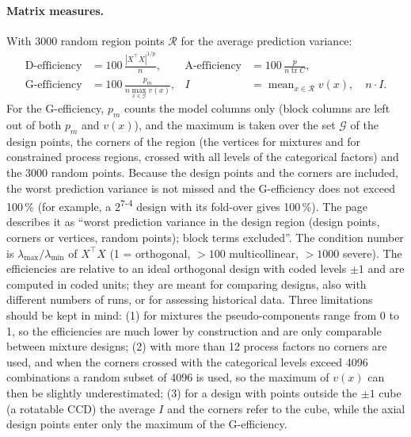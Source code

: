 \paragraph{Matrix measures.} With 3000 random region points $\mathcal{R}$ for the average prediction variance:
\begin{align}
\text{D-efficiency} &= 100\,\frac{|X^\top X|^{1/p}}{n}, &
\text{A-efficiency} &= 100\,\frac{p}{n \operatorname{tr} C}, \label{eq:ch04-deff}\\
\text{G-efficiency} &= 100\,\frac{p_m}{n \max_{x \in \mathcal{G}} v(x)}, &
I &= \operatorname{mean}_{x \in \mathcal{R}} v(x), \quad n \cdot I . \label{eq:ch04-geff}
\end{align}
For the G-efficiency, $p_m$ counts the model columns only (block columns are left out of both $p_m$ and $v(x)$), and
the maximum is taken over the set $\mathcal{G}$ of the design points, the corners of the region (the vertices for
mixtures and for constrained process regions, crossed with all levels of the categorical factors) and the 3000
random points. Because the design points and the corners are included, the worst prediction variance is not missed
and the G-efficiency does not exceed 100\,\% (for example, a 2\textsuperscript{7-4} design with its fold-over
gives 100\,\%). The page describes it as ``worst prediction variance in the design region (design points, corners or
vertices, random points); block terms excluded''. The condition number is $\lambda_{\max}/\lambda_{\min}$ of $X^\top X$ (1 = orthogonal, $> 100$ multicollinear,
$> 1000$ severe). The efficiencies are relative to an ideal orthogonal design with coded levels $\pm 1$ and are
computed in coded units; they are meant for comparing designs, also with different numbers of runs, or for assessing
historical data. Three limitations should be kept in mind: (1) for mixtures the pseudo-components range from 0 to 1,
so the efficiencies are much lower by construction and are only comparable between mixture designs; (2) with more
than 12 process factors no corners are used, and when the corners crossed with the categorical levels exceed 4096
combinations a random subset of 4096 is used, so the maximum of $v(x)$ can then be slightly underestimated; (3) for a
design with points outside the $\pm 1$ cube (a rotatable CCD) the average $I$ and the corners refer to the cube,
while the axial design points enter only the maximum of the G-efficiency.


